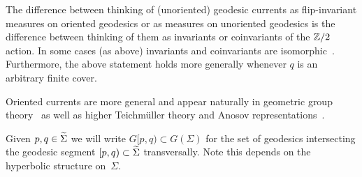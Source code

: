 \begin{remark}
  The difference between thinking of (unoriented)
  geodesic currents as flip-invariant measures on oriented geodesics or
  as measures on unoriented geodesics
  is the difference between thinking of them as invariants or
  coinvariants of the $\mathbb{Z}/2$ action. In some cases (as above)
  invariants and coinvariants are isomorphic~\cite[Lemma~2.20]{AM10:Coinvariant}. Furthermore, the above statement holds more generally whenever $q$ is an arbitrary finite cover.
\end{remark}


Oriented currents are
more
general and appear naturally in geometric group theory~\cite{Bonahon91:CurrentsGroups,EPS20:CountingCurves,
  CR25:Manhattan, CMGR26:GreenMetrics} as well as
higher Teichm\"uller theory and Anosov
representations~\cite{BridgemanCanaryLabourieSambarino18:SimpleRoots}.

Given $p,q \in \widetilde{\Sigma}$ we will write $G[p,q)\subset G(\Sigma)$
for the set of geodesics intersecting the geodesic segment
$[p,q) \subset \widetilde{\Sigma}$ transversally. Note this depends on the
hyperbolic structure on~$\Sigma$.

